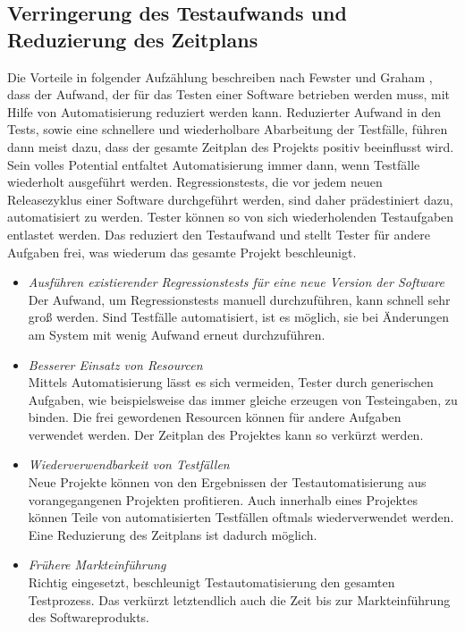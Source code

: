 \subsection{Verringerung des Testaufwands und Reduzierung des Zeitplans}
\label{sec:verringerung_des_testaufwands_und_reduzierung_des_zeitplans}
Die Vorteile in folgender Aufzählung beschreiben nach Fewster und Graham \cite[vgl. S. 9 ff.]{fewster_software_1999}, dass der Aufwand, der für das Testen einer Software betrieben werden muss, mit Hilfe von Automatisierung reduziert werden kann.
Reduzierter Aufwand in den Tests, sowie eine schnellere und wiederholbare Abarbeitung der Testfälle, führen dann meist dazu, dass der gesamte Zeitplan des Projekts positiv beeinflusst wird. Sein volles Potential entfaltet Automatisierung immer dann, wenn Testfälle wiederholt ausgeführt werden. Regressionstests, die vor jedem neuen Releasezyklus einer Software durchgeführt werden, sind daher prädestiniert dazu, automatisiert zu werden. Tester können so von sich wiederholenden Testaufgaben entlastet werden. Das reduziert den Testaufwand und stellt Tester für andere Aufgaben frei, was wiederum das gesamte Projekt beschleunigt.

\begin{itemize}
\item \textit{Ausführen existierender Regressionstests für eine neue Version der Software} \\
Der Aufwand, um Regressionstests manuell durchzuführen, kann schnell sehr groß werden. Sind Testfälle automatisiert, ist es möglich, sie bei Änderungen am System mit wenig Aufwand erneut durchzuführen.
\item \textit{Besserer Einsatz von Resourcen} \\
Mittels Automatisierung lässt es sich vermeiden, Tester durch generischen Aufgaben, wie beispielsweise das immer gleiche erzeugen von Testeingaben, zu binden.
Die frei gewordenen Resourcen können für andere Aufgaben verwendet werden.
Der Zeitplan des Projektes kann so verkürzt werden. 
\item \textit{Wiederverwendbarkeit von Testfällen} \\
Neue Projekte können von den Ergebnissen der Testautomatisierung aus vorangegangenen Projekten profitieren. Auch innerhalb eines Projektes können Teile von automatisierten Testfällen oftmals wiederverwendet werden.
Eine Reduzierung des Zeitplans ist dadurch möglich.
\item \textit{Frühere Markteinführung} \\
Richtig eingesetzt, beschleunigt Testautomatisierung den gesamten Testprozess. Das verkürzt letztendlich auch die Zeit bis zur Markteinführung des Softwareprodukts. 
\end{itemize}


